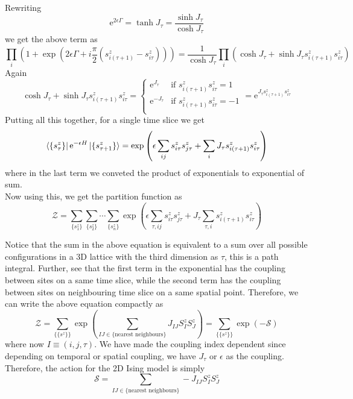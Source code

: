 \documentclass[11pt]{article}
\newcommand{\e}{\mathrm{e}}
\numberwithin{equation}{section}
\begin{document}
Rewriting 
\begin{equation*}
    \e^{2\epsilon \Gamma} = \tanh J_\tau = \frac{\sinh J_\tau}{\cosh J_\tau}
\end{equation*}
we get the above term as 
\begin{equation*}
    \prod_i \left(1 +  \exp\left(2\epsilon \Gamma + i\frac{\pi}{2}(s_{i(\tau+1)}^z-s_{i\tau}^z)\right) \right)
    = \frac{1}{\cosh J_\tau}\prod_i \left(\cosh J_\tau +  \sinh J_\tau s_{i(\tau+1)}^z s_{i\tau}^z \right)  
\end{equation*}
Again 
\begin{equation*}
    \cosh J_\tau +  \sinh J_\tau s_{i(\tau+1)}^z s_{i\tau}^z = \begin{cases}
        \e^{J_\tau} & \text{if } s_{i(\tau+1)}^z s_{i\tau}^z = 1 \\
        \e^{-J_\tau} & \text{if } s_{i(\tau+1)}^z s_{i\tau}^z = -1 \\
    \end{cases} = \e^{J_\tau s_{i(\tau+1)}^z s_{i\tau}^z}
\end{equation*}
Putting all this together, for a single time slice we get
\begin{equation*}
    \bra{\{s_\tau^z\}} \e^{-\epsilon H} \ket{\{s_{\tau+1}^z\}} = \exp\left(\epsilon \sum_{ij} s^z_{i\tau}s^z_{j\tau}+\sum_i J_\tau s_{i(\tau+1)}^z s_{i\tau}^z \right) 
\end{equation*}
where in the last term we conveted the product of exponentials to exponential of sum.\\

Now using this, we get the partition function as 
\begin{equation*}
    \mathcal{Z} = \sum_{\{s_1^z\}}\sum_{\{s_2^z\}}\cdots\sum_{\{s_{n}^z\}} \exp\left(\epsilon \sum_{\tau,ij} s^z_{i\tau}s^z_{j\tau}+J_\tau\sum_{\tau,i}  s_{i(\tau+1)}^z s_{i\tau}^z \right) 
\end{equation*}

Notice that the sum in the above equation is equivalent to a sum over all possible configurations in a 3D lattice with the third dimension as \(\tau\), this is a path integral. Further, see that the first term in the exponential has the coupling between sites on a same time slice, while the second term has the coupling between sites on neighbouring time slice on a same spatial point. Therefore, we can write the above equation compactly as 
\begin{equation*}
    \mathcal{Z} = \sum_{\{\{s^z\}\}} \exp\left(  \sum_{IJ\in \{\text{nearest neighbours}\}} J_{IJ} S_I^z S_J^z \right) =  \sum_{\{\{s^z\}\}} \exp\left(  -\mathcal{S}  \right)
\end{equation*}
where now \(I \equiv (i, j, \tau)\). We have made the coupling index dependent since depending on temporal or spatial coupling, we have \(J_\tau\) or \(\epsilon\) as the coupling. Therefore, the action for the 2D Ising model is simply 
\begin{equation*}
    \mathcal{S} =  \sum_{IJ\in \{\text{nearest neighbours}\}} -J_{IJ} S_I^z S_J^z
\end{equation*} 
\end{document}
